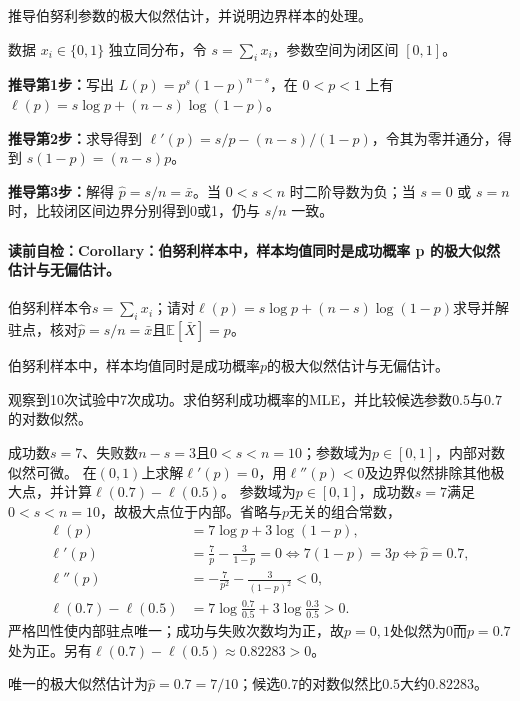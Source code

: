 \begin{derivationgoalbox}
推导伯努利参数的极大似然估计，并说明边界样本的处理。
\end{derivationgoalbox}
\begin{derivationprepbox}
数据 $x_i\in\{0,1\}$ 独立同分布，令 $s=\sum_ix_i$，参数空间为闭区间 $[0,1]$。
\end{derivationprepbox}
\textbf{推导第1步：}写出 $L(p)=p^s(1-p)^{n-s}$，在 $0<p<1$ 上有 $\ell(p)=s\log p+(n-s)\log(1-p)$。

\textbf{推导第2步：}求导得到 $\ell'(p)=s/p-(n-s)/(1-p)$，令其为零并通分，得到 $s(1-p)=(n-s)p$。

\textbf{推导第3步：}解得 $\hat p=s/n=\bar x$。当 $0<s<n$ 时二阶导数为负；当 $s=0$ 或 $s=n$ 时，比较闭区间边界分别得到0或1，仍与 $s/n$ 一致。

\label{struct:V1-C05-CH14}
\paragraph{读前自检：Corollary：伯努利样本中，样本均值同时是成功概率 p 的极大似然估计与无偏估计。}伯努利样本令$s=\sum_i x_i$；请对$\ell(p)=s\log p+(n-s)\log(1-p)$求导并解驻点，核对$\widehat p=s/n=\bar x$且$\mathbb E[\bar X]=p$。\par

\begin{corollary}
伯努利样本中，样本均值同时是成功概率$p$的极大似然估计与无偏估计。
\end{corollary}

\label{struct:V1-C05-CH20}
\begin{example}[十次伯努利试验的极大似然]\label{exm:V1-C05-binomial-mle}
观察到10次试验中7次成功。求伯努利成功概率的MLE，并比较候选参数$0.5$与$0.7$的对数似然。
\end{example}
\begin{solution}
\SolGiven 成功数$s=7$、失败数$n-s=3$且$0<s<n=10$；参数域为$p\in[0,1]$，内部对数似然可微。
\SolPlan 在$(0,1)$上求解$\ell'(p)=0$，用$\ell''(p)<0$及边界似然排除其他极大点，并计算$\ell(0.7)-\ell(0.5)$。
\SolDerive
参数域为$p\in[0,1]$，成功数$s=7$满足$0<s<n=10$，故极大点位于内部。省略与$p$无关的组合常数，
\[
\begin{aligned}
\ell(p)&=7\log p+3\log(1-p),\\
\ell'(p)&=\frac7p-\frac3{1-p}=0
\Longleftrightarrow 7(1-p)=3p
\Longleftrightarrow \widehat p=0.7,\\
\ell''(p)&=-\frac7{p^2}-\frac3{(1-p)^2}<0,\\
\ell(0.7)-\ell(0.5)
&=7\log\frac{0.7}{0.5}+3\log\frac{0.3}{0.5}>0.
\end{aligned}
\]
\SolCheck 严格凹性使内部驻点唯一；成功与失败次数均为正，故$p=0,1$处似然为$0$而$p=0.7$处为正。另有$\ell(0.7)-\ell(0.5)\approx0.82283>0$。

\SolAnswer 唯一的极大似然估计为$\widehat p=0.7=7/10$；候选$0.7$的对数似然比$0.5$大约$0.82283$。
\end{solution}


